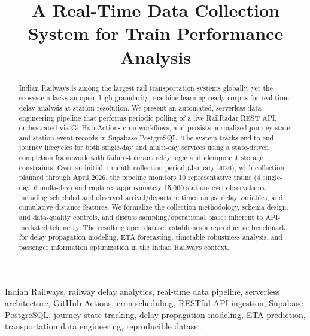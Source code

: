 \documentclass[conference]{IEEEtran}
\begin{document}
\title{A Real-Time Data Collection System for Train Performance Analysis}

\author{
\and
{}
}


\maketitle

\begin{abstract}
Indian Railways is among the largest rail transportation systems globally, yet the ecosystem lacks an open, high-granularity, machine-learning-ready corpus for real-time delay analysis at station resolution. We present an automated, serverless data engineering pipeline that performs periodic polling of a live RailRadar REST API, orchestrated via GitHub Actions cron workflows, and persists normalized journey-state and station-event records in Supabase PostgreSQL. The system tracks end-to-end journey lifecycles for both single-day and multi-day services using a state-driven completion framework with failure-tolerant retry logic and idempotent storage constraints. Over an initial 1-month collection period (January 2026), with collection planned through April 2026, the pipeline monitors 10 representative trains (4 single-day, 6 multi-day) and captures approximately 15,000 station-level observations, including scheduled and observed arrival/departure timestamps, delay variables, and cumulative distance features. We formalize the collection methodology, schema design, and data-quality controls, and discuss sampling/operational biases inherent to API-mediated telemetry. The resulting open dataset establishes a reproducible benchmark for delay propagation modeling, ETA forecasting, timetable robustness analysis, and passenger information optimization in the Indian Railways context.
\end{abstract}

\begin{IEEEkeywords}
Indian Railways, railway delay analytics, real-time data pipeline, serverless architecture, GitHub Actions, cron scheduling, RESTful API ingestion, Supabase PostgreSQL, journey state tracking, delay propagation modeling, ETA prediction, transportation data engineering, reproducible dataset
\end{IEEEkeywords}
\end{document}
